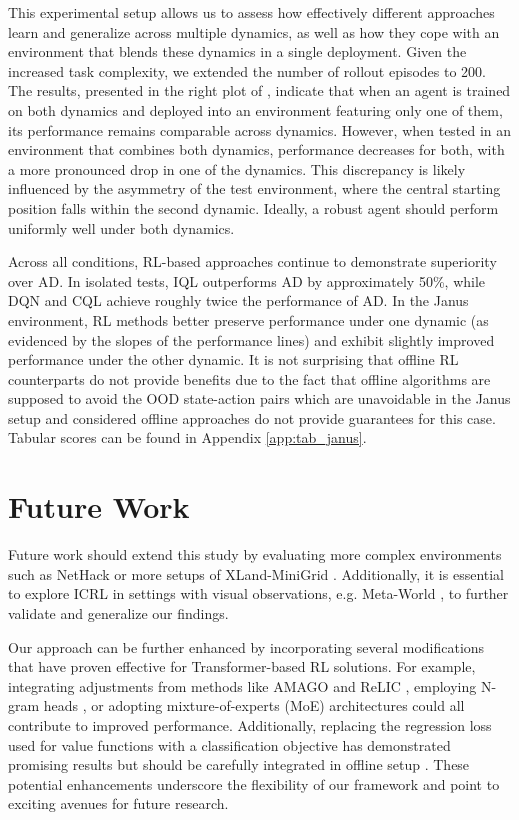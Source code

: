\documentclass{article} %
\begin{document}
This experimental setup allows us to assess how effectively different approaches learn and generalize across multiple dynamics, as well as how they cope with an environment that blends these dynamics in a single deployment. Given the increased task complexity, we extended the number of rollout episodes to 200. The results, presented in the right plot of , indicate that when an agent is trained on both dynamics and deployed into an environment featuring only one of them, its performance remains comparable across dynamics. However, when tested in an environment that combines both dynamics, performance decreases for both, with a more pronounced drop in one of the dynamics. This discrepancy is likely influenced by the asymmetry of the test environment, where the central starting position falls within the second dynamic. Ideally, a robust agent should perform uniformly well under both dynamics.

Across all conditions, RL-based approaches continue to demonstrate superiority over AD. In isolated tests, IQL outperforms AD by approximately 50\%, while DQN and CQL achieve roughly twice the performance of AD. In the Janus environment, RL methods better preserve performance under one dynamic (as evidenced by the slopes of the performance lines) and exhibit slightly improved performance under the other dynamic. It is not surprising that offline RL counterparts do not provide benefits due to the fact that offline algorithms are supposed to avoid the OOD state-action pairs which are unavoidable in the Janus setup and considered offline approaches do not provide guarantees for this case. Tabular scores can be found in Appendix \ref{app:tab_janus}.

\section{Future Work}
\label{app:future}
Future work should extend this study by evaluating more complex environments such as NetHack \citep{kuttler2020nethack, kurenkov2024katakomba} or more setups of XLand-MiniGrid \citep{nikulin2023xland, nikulin2024xland}. Additionally, it is essential to explore ICRL in settings with visual observations, e.g. Meta-World \citep{yu2020meta}, to further validate and generalize our findings. 

Our approach can be further enhanced by incorporating several modifications that have proven effective for Transformer-based RL solutions. For example, integrating adjustments from methods like AMAGO and ReLIC \citep{grigsby2023amago, elawady2024relic}, employing N-gram heads \citep{akyurek2024context, zisman2024n}, or adopting mixture-of-experts (MoE) architectures \citep{shazeer2017outrageously, obando2024mixtures} could all contribute to improved performance. Additionally, replacing the regression loss used for value functions with a classification objective has demonstrated promising results \citep{farebrother2024stop} but should be carefully integrated in offline setup \citep{tarasov2024value}. These potential enhancements underscore the flexibility of our framework and point to exciting avenues for future research.
\end{document}
